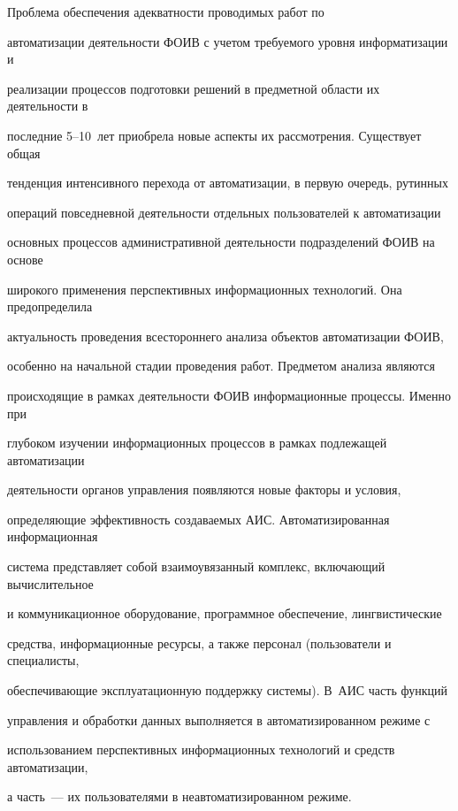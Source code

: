        


       Проблема обеспечения адекватности проводимых работ по 


автоматизации деятельности ФОИВ с учетом требуемого уровня информатизации и 


реализации процессов подготовки решений в предметной области их деятельности в 


последние 5--10~лет приобрела новые аспекты их рассмотрения. Существует общая 


тенденция интенсивного перехода от автоматизации, в первую очередь, рутинных 


операций повседневной деятельности отдельных пользователей к автоматизации 


основных процессов административной деятельности подразделений ФОИВ на основе 


широкого применения перспективных информационных технологий. Она предопределила 


актуальность проведения всестороннего анализа объектов автоматизации ФОИВ, 


особенно на начальной стадии проведения работ. Предметом анализа являются 


происходящие в рамках деятельности ФОИВ информационные процессы. Именно при 


глубоком изучении информационных процессов в рамках подлежащей автоматизации 


деятельности органов управления появляются новые факторы и условия, 


определяющие эффективность создаваемых АИС. Автоматизированная информационная 


система представляет собой взаимоувязанный комплекс, включающий вычислительное 


и коммуникационное оборудование, программное обеспечение, лингвистические 


средства, информационные ресурсы, а также персонал (пользователи и специалисты, 


обеспечивающие эксплуатационную поддержку системы). В~АИС часть функций 


управления и обработки данных выполняется в автоматизированном режиме с 


использованием перспективных информационных технологий и средств автоматизации, 


а часть~--- их пользователями в неавтоматизированном режиме.


       


